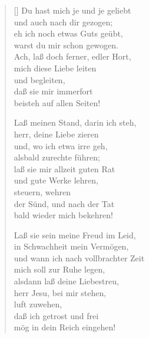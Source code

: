 \begin{multicols}{2}
\begin{verse}[\versewidth]
 Du hast mich je und je geliebt\\
und auch nach dir gezogen;\\
eh ich noch etwas Guts geübt,\\
warst du mir schon gewogen.\\
Ach, laß doch ferner, edler Hort,\\
mich diese Liebe leiten\\
und begleiten,\\
daß sie mir immerfort\\
beisteh auf allen Seiten!

 Laß meinen Stand, darin ich steh,\\
herr, deine Liebe zieren\\
und, wo ich etwa irre geh,\\
alsbald zurechte führen;\\
laß sie mir allzeit guten Rat\\
und gute Werke lehren,\\
steuern, wehren\\
der Sünd, und nach der Tat\\
bald wieder mich bekehren!

 Laß sie sein meine Freud im Leid,\\
in Schwachheit mein Vermögen,\\
und wann ich nach vollbrachter Zeit\\
mich soll zur Ruhe legen,\\
alsdann laß deine Liebestreu,\\
herr Jesu, bei mir stehen,\\
luft zuwehen,\\
daß ich getrost und frei\\
mög in dein Reich eingehen!

\end{verse}
\end{multicols}
